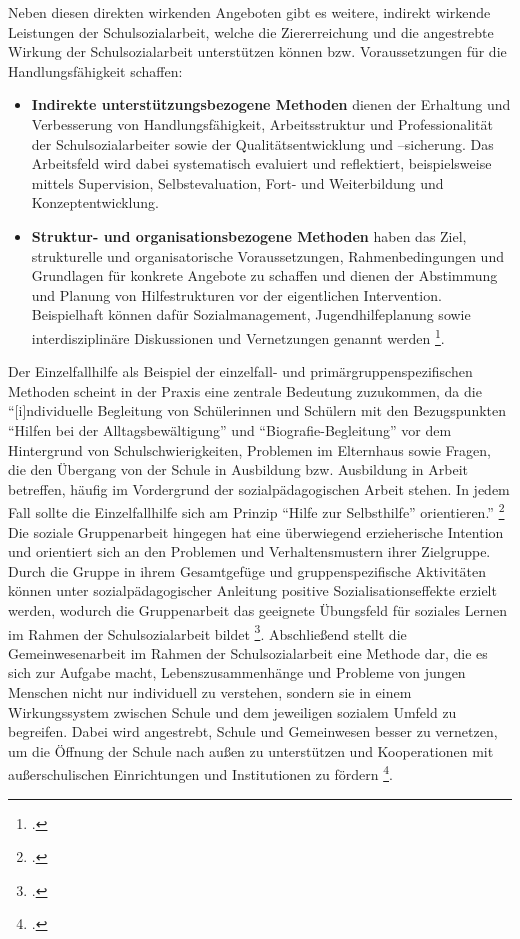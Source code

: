 Neben diesen direkten wirkenden Angeboten gibt es weitere, indirekt wirkende Leistungen der Schulsozialarbeit, welche die Ziererreichung und die angestrebte Wirkung der Schulsozialarbeit unterstützen können bzw. Voraussetzungen für die Handlungsfähigkeit schaffen:\\
\begin{itemize}
	\item \textbf{Indirekte unterstützungsbezogene Methoden} dienen der Erhaltung und Verbesserung von Handlungsfähigkeit, Arbeitsstruktur und Professionalität der Schulsozialarbeiter sowie der Qualitätsentwicklung und –sicherung. Das Arbeitsfeld wird dabei systematisch evaluiert und reflektiert, beispielsweise mittels Supervision, Selbstevaluation, Fort- und Weiterbildung und Konzeptentwicklung. 
	\item \textbf{Struktur- und organisationsbezogene Methoden} haben das Ziel, strukturelle und organisatorische Voraussetzungen, Rahmenbedingungen und Grundlagen für konkrete Angebote zu schaffen und dienen der Abstimmung und Planung von Hilfestrukturen vor der eigentlichen Intervention. Beispielhaft können dafür Sozialmanagement, Jugendhilfeplanung sowie interdisziplinäre Diskussionen und Vernetzungen genannt werden \footcite[vgl.][96ff]{Stuewe2015}.
\end{itemize}
 
Der Einzelfallhilfe als Beispiel der einzelfall- und primärgruppenspezifischen Methoden scheint in der Praxis eine zentrale Bedeutung zuzukommen, da die "`[i]ndividuelle Begleitung von Schülerinnen und Schülern mit den Bezugspunkten "`Hilfen bei der Alltagsbewältigung"' und "`Biografie-Begleitung"' vor dem Hintergrund von Schulschwierigkeiten, Problemen im Elternhaus sowie Fragen, die den Übergang von der Schule in Ausbildung bzw. Ausbildung in Arbeit betreffen, häufig im Vordergrund der sozialpädagogischen Arbeit stehen. In jedem Fall sollte die Einzelfallhilfe sich am Prinzip "`Hilfe zur Selbsthilfe"' orientieren."' \footcite[23]{SMSSS2009} Die soziale Gruppenarbeit hingegen hat eine überwiegend erzieherische Intention und orientiert sich an den Problemen und Verhaltensmustern ihrer Zielgruppe. Durch die Gruppe in ihrem Gesamtgefüge und gruppenspezifische Aktivitäten können unter sozialpädagogischer Anleitung positive Sozialisationseffekte erzielt werden, wodurch die Gruppenarbeit das geeignete Übungsfeld für soziales Lernen im Rahmen der Schulsozialarbeit bildet \footcite[vgl.][24]{SMSSS2009}. Abschließend stellt die Gemeinwesenarbeit im Rahmen der Schulsozialarbeit eine Methode dar, die es sich zur Aufgabe macht, Lebenszusammenhänge und Probleme von jungen Menschen nicht nur individuell zu verstehen, sondern sie in einem Wirkungssystem zwischen Schule und dem jeweiligen sozialem Umfeld zu begreifen. Dabei wird angestrebt, Schule und Gemeinwesen besser zu vernetzen, um die Öffnung der Schule nach außen zu unterstützen und Kooperationen mit außerschulischen Einrichtungen und Institutionen zu fördern \footcite[vgl.][25]{SMSSS2009}. 

